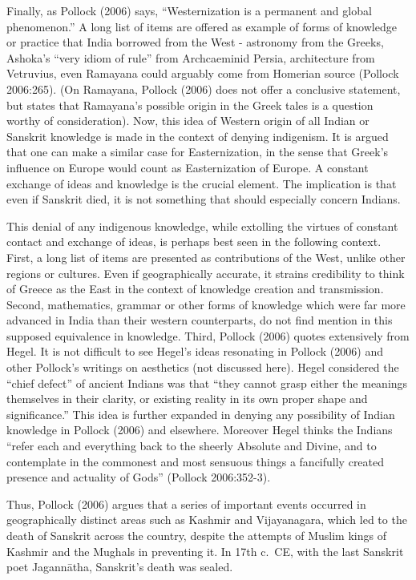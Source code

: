 Finally, as Pollock (2006) says, “Westernization is a permanent and global phenomenon.” A long list of items are offered as example of forms of knowledge or practice that India borrowed from the West - astronomy from the Greeks, Ashoka’s “very idiom of rule” from  Archcaeminid Persia, architecture from Vetruvius, even Ramayana could arguably come from Homerian source (Pollock 2006:265). (On Ramayana, Pollock (2006) does not offer a conclusive statement, but states that Ramayana’s possible origin in the Greek tales is a question worthy of consideration). Now, this idea of Western origin of all Indian or Sanskrit knowledge is made in the context of denying indigenism. It is argued that one can make a similar case for Easternization, in the sense that Greek’s influence on Europe would count as Easternization of Europe. A constant exchange of ideas and knowledge is the crucial element. The implication is that even if Sanskrit died, it is not something that should especially concern Indians.

This denial of any indigenous knowledge, while extolling the virtues of constant contact and exchange of ideas, is perhaps best seen in the following context. First, a long list of items are presented as contributions of the West, unlike other regions or cultures. Even if geographically accurate, it strains credibility to think of Greece as the East in the context of knowledge creation and transmission. Second, mathematics, grammar or other forms of knowledge which were far more advanced in India than their western counterparts, do not find mention in this supposed equivalence in knowledge. Third, Pollock (2006) quotes extensively from Hegel. It is not difficult to see Hegel’s ideas resonating in Pollock (2006) and other Pollock’s writings on aesthetics (not discussed here). Hegel considered the “chief defect” of ancient Indians was that “they cannot grasp either the meanings themselves in their clarity, or existing reality in its own proper shape and significance.” This idea is further expanded in denying any possibility of Indian knowledge in Pollock (2006) and elsewhere. Moreover Hegel thinks the Indians “refer each and everything back to the sheerly Absolute and Divine, and to contemplate in the commonest and most sensuous things a fancifully created presence and actuality of Gods” (Pollock 2006:352-3).

Thus, Pollock (2006) argues that a series of important events occurred in geographically distinct areas such as Kashmir and Vijayanagara, which led to the death of Sanskrit across the country, despite the attempts of Muslim kings of Kashmir and the Mughals in preventing it. In 17th c.\ CE, with the last Sanskrit poet Jagannātha, Sanskrit’s death was sealed.

